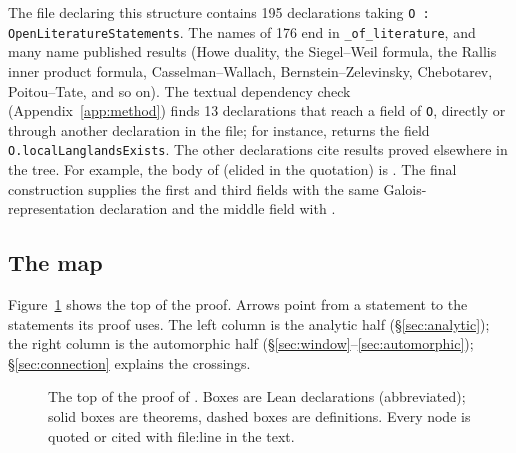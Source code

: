 The file declaring this structure contains 195 declarations taking
\texttt{O : OpenLiteratureStatements}. The names of 176 end in \texttt{\_of\_literature}, and many
name published results (Howe duality, the Siegel--Weil formula, the Rallis inner product formula,
Casselman--Wallach, Bernstein--Zelevinsky, Chebotarev, Poitou--Tate, and so on). The textual
dependency check (Appendix~\ref{app:method}) finds 13 declarations that reach a field of
\texttt{O}, directly or through another declaration in the file; for instance,
 returns the field
\texttt{O.localLanglandsExists}. The other declarations cite results proved elsewhere in the tree.
For example, the body of
\noindent (elided in the quotation) is . The
final construction supplies the first and third fields with the same Galois-representation
declaration and the middle field with .

\subsection{The map}

Figure~\ref{fig:top} shows the top of the proof. Arrows point from a statement to the statements
its proof uses. The left column is the analytic half (\S\ref{sec:analytic}); the right column is the
automorphic half (\S\ref{sec:window}--\ref{sec:automorphic}); \S\ref{sec:connection} explains the
crossings.

\begin{figure}[ht]
\centering

\caption{The top of the proof of . Boxes are Lean declarations
(abbreviated); solid boxes are theorems, dashed boxes are definitions. Every node is quoted or cited
with file:line in the text.}
\label{fig:top}
\end{figure}
